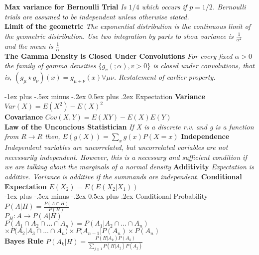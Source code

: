 \documentclass[10pt,landscape]{article}
\makeatletter
\renewcommand{\section}{\@startsection{section}{1}{0mm}%
                                {-1ex plus -.5ex minus -.2ex}%
                                {0.5ex plus .2ex}%
                                {\normalfont\large\bfseries}}
\makeatother
\begin{document}
\begin{multicols*}{3}
\textbf{Max variance for Bernoulli Trial} \textit{Is $1/4$ which occurs if $p=1/2$. Bernoulli trials are assumed to be independent unless otherwise stated.}\\
\textbf{Limit of the geometric} \textit{The exponential distribution is the continuous limit of the geometric distribution. Use two integration by parts to show variance is $\frac{1}{\alpha^2}$ and the mean is $\frac{1}{\alpha}$}\\
\textbf{The Gamma Density is Closed Under Convolutions} \textit{For every fixed $\alpha>0$ the family of gamma densities $\{g_v(\dot;\alpha), v>0\}$ is closed under convolutions, that is, $(g_\mu\star g_\nu)(x)=g_{\mu+\nu}(x) \forall\mu \nu$. Restatement of earlier property.}

\section{Expectation}
\textbf{Variance} $Var(X)=E(X^2)-E(X)^2$\\
\textbf{Covariance} $Cov(X,Y)=E(XY)- E(X)E(Y)$\\
\textbf{Law of the Unconcious Statistician}
 \textit{If X is a discrete r.v. and g is a function from {$R\rightarrow R$} then, $E(g(X))=\sum_{x}g(x)P(X=x)$}
\textbf{Independence} \textit{Independent variables are uncorrelated, but uncorrelated variables are not necessarily independent. However, this is a necessary and sufficient condition if we are talking about the marginals of a normal density}
\textbf{Additivity} \textit{Expectation is additive. Variance is additive if the summands are independent.}
\textbf{Conditional Expectation} \textit{$E(X_2)=E(E(X_2|X_1))$}\\


\section{Conditional Probability}
$P(A|H)=\frac{P(A \cap H)}{P(H)}$\\
$P_H: A \rightarrow P(A|H)$\\
$P(A_1 \cap A_2 \cap ... \cap A_n)= P(A_1|A_2 \cap ... \cap A_n)$\\ $\times P(A_2|A_3 \cap ... \cap A_n) \times P(A_{n-1}|P(A_n) \times P(A_n)$\\
\textbf{Bayes Rule}
$P(A_k|H)=\frac{P(H|A_k)P(A_k)}{\sum_{j \geq 1}{} P(H|A_j)P(A_j)}$


\end{multicols*}
\end{document}
